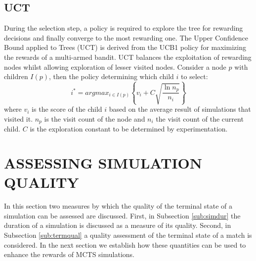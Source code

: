 \documentclass{ecai2014}
\begin{document}
\subsection{UCT}
\label{subsec:uct}
During the selection step, a policy is required to explore the tree for rewarding decisions and finally converge to the most rewarding one. The Upper Confidence Bound applied to Trees (UCT) \cite{kocsis2006bandit} is derived from the UCB1 policy \cite{auer2002using} for maximizing the rewards of a multi-armed bandit. UCT balances the exploitation of rewarding nodes whilst allowing exploration of lesser visited nodes. Consider a node $p$ with children $I(p)$, then the policy determining which child $i$ to select:
\begin{equation}
\label{eq:uct}
i^* = argmax_{i \in I(p)}\left\{ v_i + C \sqrt{ \frac{\ln{n_p}}{n_i}}\right\}
\end{equation}
where $v_i$ is the score of the child $i$ based on the average result of simulations that visited it. $n_p$ is the visit count of the node and $n_i$ the visit count of the current child. $C$ is the exploration constant to be determined by experimentation.

\section{ASSESSING SIMULATION QUALITY}
\label{sec:poqual}
In this section two measures by which the quality of the terminal state of a simulation can be assessed are discussed. First, in Subsection \ref{sub:simdur} the duration of a simulation is discussed as a measure of its quality. Second, in Subsection \ref{sub:termqual} a quality assessment of the terminal state of a match is considered. In the next section we establish how these quantities can be used to enhance the rewards of MCTS simulations.
\end{document}
